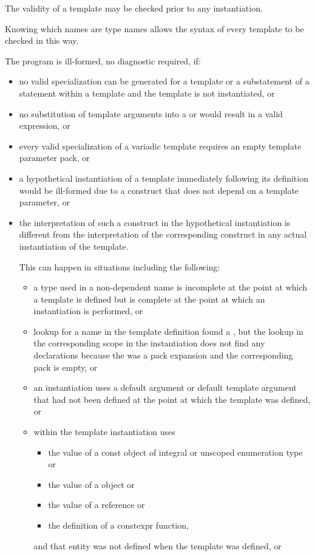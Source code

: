 \pnum
{}%
%
The validity of a template may be checked prior to any instantiation.
\begin{note}
Knowing which names are type names allows the syntax of every template
to be checked in this way.
\end{note}
The program is ill-formed, no diagnostic required, if:
\begin{itemize}
\item
no valid specialization can be generated for a template
or a substatement of a  statement within a template
and the template is not instantiated, or
\item
no substitution of template arguments
into a  or 
would result in a valid expression, or
\item
every valid specialization of a variadic template requires an empty template
parameter pack, or
\item
a hypothetical instantiation of a template
immediately following its definition
would be ill-formed
due to a construct that does not depend on a template parameter, or
\item
the interpretation of such a construct
in the hypothetical instantiation
is different from
the interpretation of the corresponding construct
in any actual instantiation of the template.
\begin{note}
This can happen in situations including the following:
\begin{itemize}
\item a type used in a non-dependent name is incomplete at the point at which a
template is defined but is complete at the point at which an instantiation is
performed, or

\item lookup for a name in the template definition found a ,
but the lookup in the corresponding scope in the instantiation
does not find any declarations because the 
was a pack expansion and the corresponding pack is empty, or

\item an instantiation uses a default argument or default template argument
that had not been defined at the point at which the template was defined, or

\item {} within the template
instantiation uses
  \begin{itemize}
  \item the value of a const object of integral or unscoped enumeration type or
  \item the value of a  object or
  \item the value of a reference or
  \item the definition of a constexpr function,
  \end{itemize}
and that entity was not defined when the template was defined, or


\end{itemize}
\end{note}
\end{itemize}
